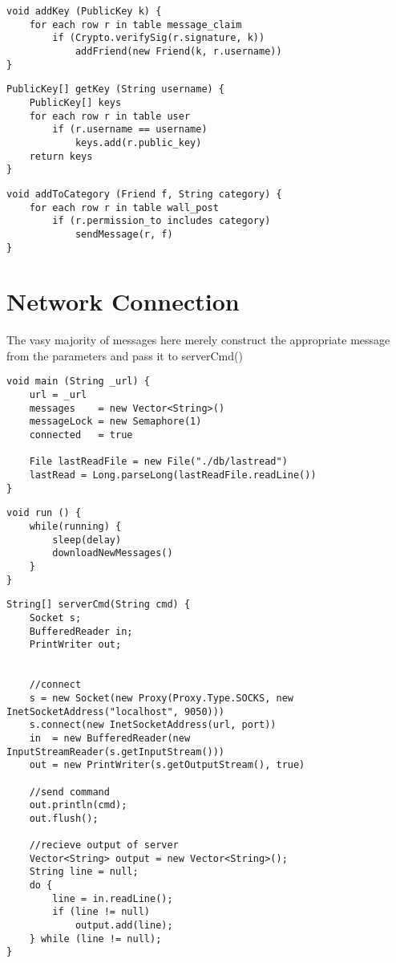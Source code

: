 \begin{lstlisting}
void addKey (PublicKey k) {
    for each row r in table message_claim
        if (Crypto.verifySig(r.signature, k))
            addFriend(new Friend(k, r.username))
}
\end{lstlisting}

\begin{lstlisting}
PublicKey[] getKey (String username) {
    PublicKey[] keys
    for each row r in table user
        if (r.username == username)
            keys.add(r.public_key)
    return keys
}
\end{lstlisting}

\begin{lstlisting}
void addToCategory (Friend f, String category) {
    for each row r in table wall_post
        if (r.permission_to includes category)
            sendMessage(r, f)
}
\end{lstlisting}


\section{Network Connection}
The vasy majority of messages here merely construct the appropriate message from
the parameters and pass it to serverCmd()

\begin{lstlisting}
void main (String _url) {
    url = _url
    messages    = new Vector<String>()
    messageLock = new Semaphore(1)
    connected   = true
    
    File lastReadFile = new File("./db/lastread")
    lastRead = Long.parseLong(lastReadFile.readLine())
}
\end{lstlisting}

\begin{lstlisting}
void run () {
    while(running) {
        sleep(delay)
        downloadNewMessages()
    }
}
\end{lstlisting}

\begin{lstlisting}
String[] serverCmd(String cmd) {
    Socket s;
    BufferedReader in;
    PrintWriter out;
        
        
    //connect
    s = new Socket(new Proxy(Proxy.Type.SOCKS, new InetSocketAddress("localhost", 9050)))
    s.connect(new InetSocketAddress(url, port))
    in  = new BufferedReader(new InputStreamReader(s.getInputStream()))
    out = new PrintWriter(s.getOutputStream(), true)
        
    //send command
    out.println(cmd);
    out.flush();
        
    //recieve output of server
    Vector<String> output = new Vector<String>();
    String line = null;
    do {
        line = in.readLine();
        if (line != null)
            output.add(line);
    } while (line != null);
}
\end{lstlisting}

